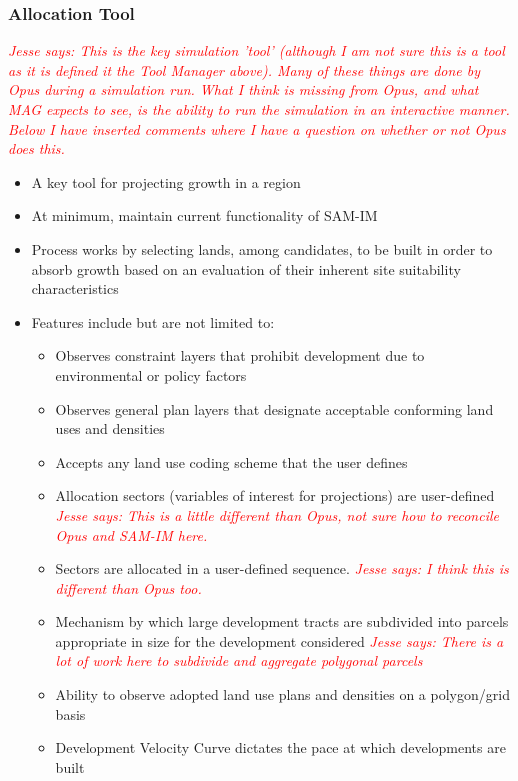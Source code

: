 \documentclass[titlepage]{article}
\begin{document}
\subsubsection{Allocation Tool}
	\textcolor{red}{\textit{Jesse says: This is the key simulation 'tool' (although I am not sure this is a tool as it is defined it the Tool Manager above).  Many of these things are done by Opus during a simulation run.  What I think is missing from Opus, and what MAG expects to see, is the ability to run the simulation in an interactive manner.  Below I have inserted comments where I have a question on whether or not Opus does this.}}
\begin{itemize}
	\item A key tool for projecting growth in a region
	\item At minimum, maintain current functionality of SAM-IM
	\item Process works by selecting lands, among candidates, to be built in order to absorb growth based on an evaluation of their inherent site suitability characteristics
	\item Features include but are not limited to:
		\begin{itemize}
			\item Observes constraint layers that prohibit development due to environmental or policy factors
			\item Observes general plan layers that designate acceptable conforming land uses and densities
			\item Accepts any land use coding scheme that the user defines
			\item Allocation sectors (variables of interest for projections) are user-defined
				\textcolor{red}{\textit{Jesse says: This is a little different than Opus, not sure how to reconcile Opus and SAM-IM here.}}
			\item Sectors are allocated in a user-defined sequence.
				\textcolor{red}{\textit{Jesse says: I think this is  different than Opus too.}}
			\item Mechanism by which large development tracts are subdivided into parcels appropriate in size for the development considered
				\textcolor{red}{\textit{Jesse says: There is a lot of work here to subdivide and aggregate polygonal parcels}}
			\item Ability to observe adopted land use plans and densities on a polygon/grid basis
			\item Development Velocity Curve dictates the pace at which developments are built

\end{itemize}
\end{itemize}
\end{document}
